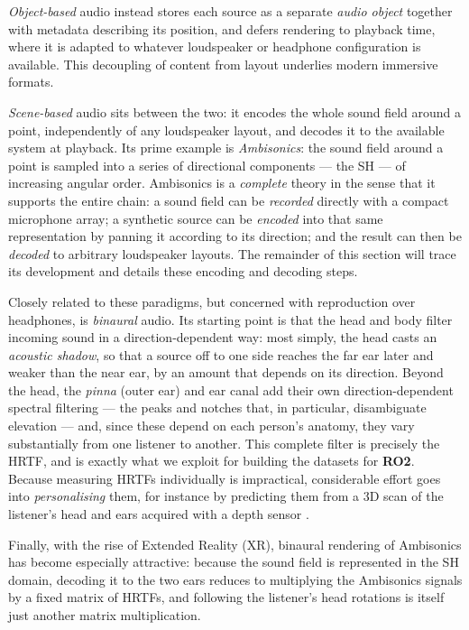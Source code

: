 \emph{Object-based} audio instead stores each source as a separate
\emph{audio object} together with metadata describing its position, and
defers rendering to playback time, where it is adapted to whatever
loudspeaker or headphone configuration is available. This decoupling of
content from layout underlies modern immersive formats.

\emph{Scene-based} audio sits between the two: it encodes the whole sound
field around a point, independently of any loudspeaker layout, and decodes
it to the available system at playback. Its prime example is \emph{Ambisonics}: the
sound field around a point is sampled into a series of directional
components --- the \acrfull{SH} --- of increasing angular order. Ambisonics is a \emph{complete} theory in the sense that it supports the
entire chain: a sound field can be
\emph{recorded} directly with a compact microphone array; a synthetic
source can be \emph{encoded} into that same representation by panning it
according to its direction; and the result can then be \emph{decoded} to
arbitrary loudspeaker layouts. The remainder of this section will trace its development and details these encoding and decoding steps.


Closely related to these paradigms, but concerned with
reproduction over headphones, is \emph{binaural} audio. Its
starting point is that the head and body filter incoming sound in a
direction-dependent way: most simply, the head casts an \emph{acoustic
shadow}, so that a source off to one side reaches the far ear later and
weaker than the near ear, by an amount that depends on its direction. Beyond the head, the \emph{pinna} (outer ear) and ear canal
add their own direction-dependent spectral filtering --- the peaks and
notches that, in particular, disambiguate elevation --- and, since these
depend on each person's anatomy, they vary substantially from one listener
to another. This complete filter is precisely the \acrfull{HRTF}, and is exactly what we exploit for building the datasets for \textbf{RO2}. Because measuring \acrshort{HRTF}s individually is
impractical, considerable effort goes into \emph{personalising}
them, for instance by predicting them from a 3D scan of the
listener's head and ears acquired with a depth sensor
\citep{miccini2020hrtf}. 

Finally, with the rise of Extended Reality (XR), binaural rendering of Ambisonics
has become especially attractive: because the sound field is represented
in the \acrshort{SH} domain, decoding it to the two ears reduces to
multiplying the Ambisonics signals by a fixed matrix of \acrshort{HRTF}s,
and following the listener's head rotations is itself just another matrix
multiplication.

